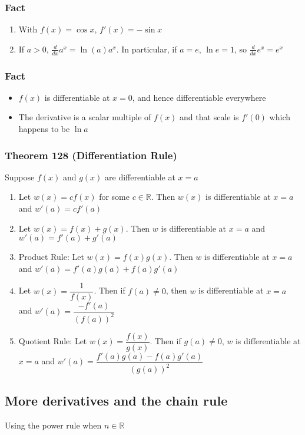 \documentclass[12pt, letterpaper]{article}
\begin{document}
\subsubsection*{Fact}
\begin{enumerate}
    \item With $f(x) = \cos x$, $f'(x) = -\sin x$
    \item If $a>0$, $\frac{d}{dx}a^x = \ln(a)a^x$. In particular, if $a=e$, $\ln e = 1$, so $\frac{d}{dx} e^x = e^x$
\end{enumerate}
\subsubsection*{Fact}
\begin{itemize}
    \item $f(x)$ is differentiable at $x=0$, and hence differentiable everywhere
    \item The derivative is a scalar multiple of $f(x)$ and that scale is $f'(0)$ which happens to be $\ln a$
\end{itemize}
\subsubsection*{Theorem 128 (Differentiation Rule)}
Suppose $f(x)$ and $g(x)$ are differentiable at $x=a$
\begin{enumerate}
    \item Let $w(x) = cf(x)$ for some $c\in\mathbb{R}$. Then $w(x)$ is differentiable at $x=a$ and $w'(a) = cf'(a)$
    \item Let $w(x) = f(x) + g(x)$. Then $w$ is differentiable at $x=a$ and $w'(a) = f'(a) + g'(a)$
    \item Product Rule: Let $w(x) = f(x)g(x)$. Then $w$ is differentiable at $x=a$ and $w'(a) = f'(a)g(a) + f(a)g'(a)$
    \item Let $w(x) = \dfrac{1}{f(x)}$. Then if $f(a) \neq 0$, then $w$ is differentiable at $x=a$ and $w'(a) = \dfrac{-f'(a)}{(f(a))^2}$
    \item Quotient Rule: Let $w(x) = \dfrac{f(x)}{g(x)}$. Then if $g(a) \neq 0$, $w$ is differentiable at $x=a$ and $w'(a) = \dfrac{f'(a)g(a) - f(a)g'(a)}{(g(a))^2}$
\end{enumerate}
\subsection{More derivatives and the chain rule}
Using the power rule when $n\in\mathbb{R}$
\end{document}
